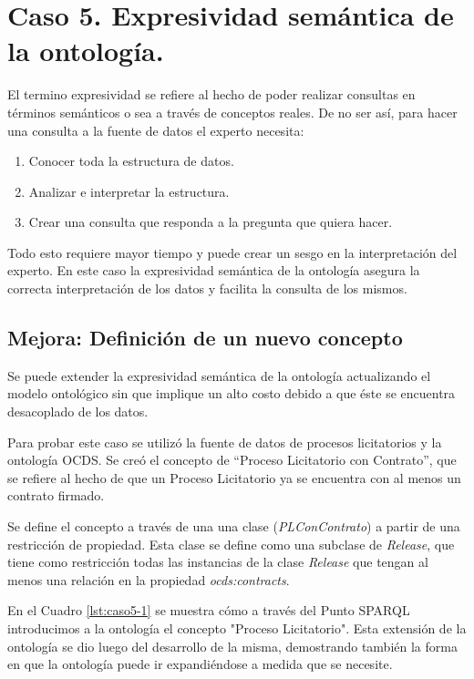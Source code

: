 \section{Caso 5. Expresividad semántica de la ontología. }
\label{section:caso5}

El termino expresividad se refiere al hecho de poder realizar consultas en términos semánticos o sea a través de conceptos reales. De no ser así, para hacer una consulta a la fuente de datos el experto necesita:

\begin{enumerate}
    \item Conocer toda la estructura de datos.
    \item Analizar e interpretar la estructura.
    \item Crear una consulta que responda a la pregunta que quiera hacer.
\end{enumerate}

Todo esto requiere mayor tiempo y puede crear un sesgo en la interpretación del experto. En este caso la expresividad semántica de la ontología asegura la correcta interpretación de los datos y facilita la consulta de los mismos.


\subsection{Mejora: Definición de un nuevo concepto}
Se puede extender la expresividad semántica de la ontología actualizando el modelo ontológico sin que implique un alto costo debido a que éste se encuentra desacoplado de los datos.

Para probar este caso se utilizó la fuente de datos de procesos licitatorios y la ontología OCDS.  Se creó el  concepto  de “Proceso Licitatorio con Contrato”, que se refiere al hecho de que un Proceso Licitatorio ya se encuentra con al menos un contrato firmado.

Se define el concepto a través de una una clase (\textit{PLConContrato}) a partir de una restricción de propiedad. Esta clase se define como una subclase de \textit{Release}, que tiene como restricción todas las instancias de la clase \textit{Release} que tengan al menos una relación en la propiedad \textit{ocds:contracts}.

En el Cuadro \ref{lst:caso5-1} se muestra cómo a través del Punto SPARQL introducimos a la ontología el concepto "Proceso Licitatorio". Esta extensión de la ontología se dio luego del desarrollo de la misma, demostrando también la forma en que la ontología puede ir expandiéndose a medida que se necesite.

